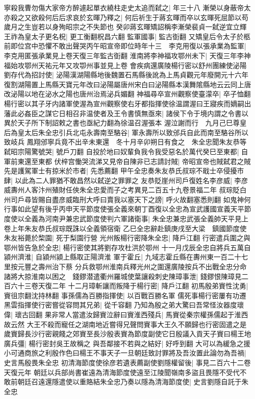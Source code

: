 寧殺我曹勿傷大家帝方醉遽起單衣繞柱走史太追而弑之|{
	年三十八}
漸榮以身蔽帝太亦殺之又欲殺何后后求哀於玄暉乃釋之|{
	何后祈生于蔣玄暉而卒以玄暉死屈節以苟歲月之生豈若以身殉昭宗之不失節也}
癸卯蔣玄暉矯詔稱李漸榮裴貞一弑逆宜立輝王祚為皇太子更名柷|{
	更工衡翻柷昌六翻}
監軍國事|{
	監古衘翻}
又矯皇后令太子於柩前即位宫中恐懼不敢出聲哭丙午昭宣帝即位時年十三　李克用復以張承業為監軍|{
	李克用匿張承業見上卷天復三年監古衘翻}
淮南將李神福攻鄂州未下|{
	天復三年李神福始攻鄂州天祐元年又攻卾州事並見上卷}
會疾病還廣陵楊行密以舒州團練使泌陽劉存代為招討使|{
	泌陽漢湖陽縣地後魏置石馬縣後訛為上馬貞觀元年廢開元十六年復割湖陽置上馬縣天寶元年改曰泌陽屬唐州宋白曰泌陽縣本漢舞隂縣地云云同上唐改泌陽以地在泌水之陽也唐州治焉泌兵媚翻}
神福尋卒宣州觀察使臺濛卒|{
	卒子恤翻}
楊行密以其子牙内諸軍使渥為宣州觀察使右牙都指揮使徐温謂渥曰王寢疾而嫡嗣出藩此必姦臣之謀它日相召非温使者及王令書慎無亟來|{
	諸侯下令于境内謂之令書以異於天子所下制詔敕之書也亟紀力翻為徐温召渥張本}
渥泣謝而行　九月己巳尊皇后為皇太后朱全忠引兵北屯永壽南至駱谷|{
	軍永壽所以致邠兵自此而南至駱谷所以致岐兵}
鳳翔邠寧兵竟不出辛未東還　冬十月辛卯朔日有食之　朱全忠聞朱友恭等弑昭宗陽驚號哭|{
	號戶刀翻}
自投於地曰奴輩負我令我受惡名於萬代癸巳至東都|{
	自軍前東還至東都}
伏梓宫慟哭流涕又見帝自陳非已志請討賊|{
	帝昭宣帝也賊弑君之賊}
先是護駕軍士有掠米於市者|{
	先悉薦翻}
甲午全忠奏朱友恭氏叔琮不戢士卒侵擾市肆|{
	以此為二人罪猶不敢昌然以弑逆之罪罪之}
友恭貶崖州司戶復姓名李彦威|{
	李彦威夀州人客汴州殖財任俠朱全忠愛而子之考異見二百五十九卷景福二年}
叔琮貶白州司戶尋皆賜自盡彦威臨刑大呼曰賣我以塞天下之謗|{
	呼火故翻塞悉則翻}
如鬼神何行事如此望有後乎丙申天平節度使張全義來朝丁酉復以全忠為宣武護國宣義天平節度使以全義為河南尹兼忠武節度使判六軍諸衛事|{
	朱全忠兼忠武張全義帥天平見上卷上年朱友恭氏叔琮既誅以全義領宿衛}
乙巳全忠辭赴鎮庚戌至大梁　鎮國節度使朱友裕薨於棃園|{
	死于梨園行營}
光州叛楊行密降朱全忠|{
	降戶江翻}
行密遣兵圍之與鄂州皆告急於全忠|{
	楊行密使其將劉存攻杜洪於鄂州}
十一月戊辰全忠自將兵五萬自潁州濟淮|{
	自潁州潁上縣取正陽濟淮}
軍于霍丘|{
	九域志霍丘縣在夀州東一百二十七里按元豐之壽州治下蔡}
分兵救鄂州淮南兵釋光州之圍還廣陵按兵不出戰全忠分命諸將大掠淮南以困之　錢鏐潜遣衢州羅城使葉讓殺刺史陳璋事泄|{
	錢鏐恨陳璋見二百六十三卷天復二年}
十二月璋斬讓而叛降于楊行密|{
	降戶江翻}
初馬殷弟賨性沈勇|{
	賨徂宗翻沈持林翻}
事孫儒為百勝指揮使|{
	以百戰百勝名軍}
儒死事楊行密屢有功遷黑雲指揮使行密嘗從容問其兄弟|{
	從千容翻}
乃知為殷之弟大驚曰吾常怪汝器度瓌偉|{
	瓌古回翻}
果非常人當遣汝歸賨泣辭曰賨淮西殘兵|{
	馬賨從秦宗權孫儒起于淮西故云然}
大王不殺而寵任之湖南地近嘗得兄聲問賨事大王久不願歸也行密固遣之是歲賨歸長沙行密親餞之郊賨至長沙殷表賨為節度副使它日殷議入貢天子賨曰楊王地廣兵彊|{
	楊行密封吳王故稱之}
與吾鄰接不若與之結好|{
	好呼到翻}
大可以為緩急之援小可通商旅之利殷作色曰楊王不事天子一旦朝廷致討罪將及吾汝置此論勿為吾禍|{
	史言馬殷畏朱全忠}
初清海節度使徐彦若遺表薦副使劉隱權留後|{
	事見二百六十二卷天復元年}
朝廷以兵部尚書崔遠為清海節度使遠至江陵聞嶺南多盜且畏隱不受代不敢前朝廷召遠還隱遣使以重賂結朱全忠乃奏以隱為清海節度使|{
	史言劉隱自託于朱全忠}


